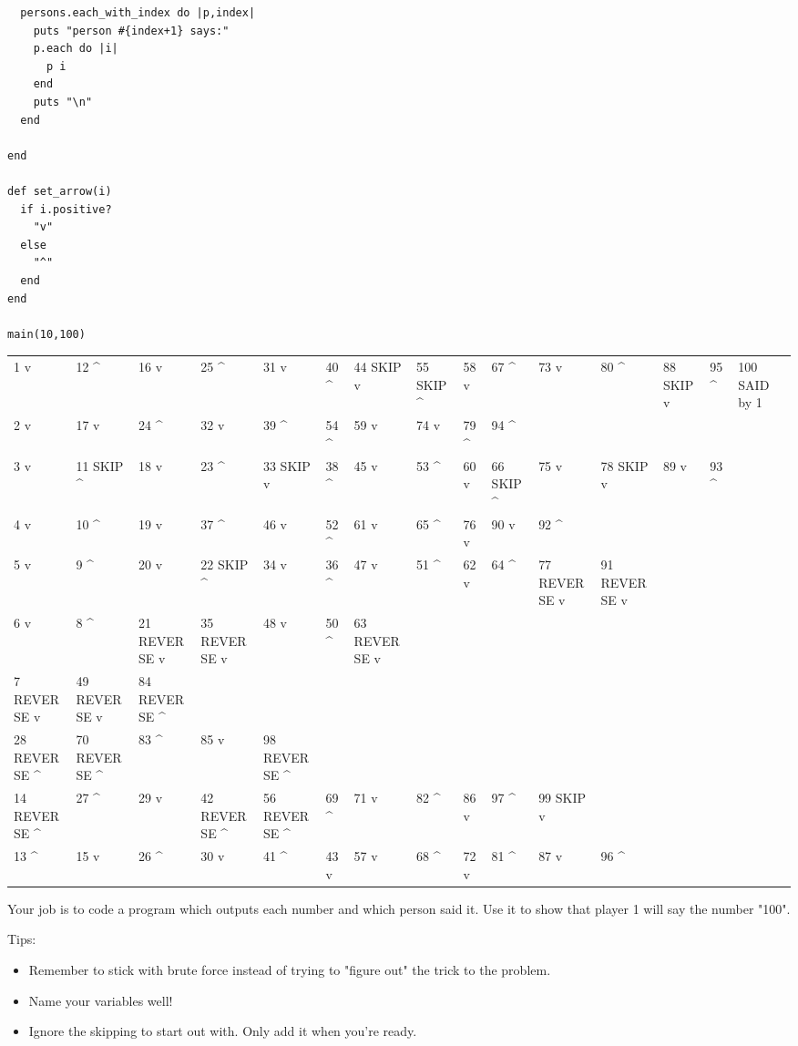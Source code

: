 \documentclass[11pt]{article}
\begin{document}
\begin{itemize}
\begin{verbatim}
  persons.each_with_index do |p,index|
    puts "person #{index+1} says:"
    p.each do |i|
      p i
    end
    puts "\n"
  end

end

def set_arrow(i)
  if i.positive?
    "v"
  else
    "^"
  end
end

main(10,100)
\end{verbatim}

\begin{center}
\begin{tabular}{lllllllllllllll}
1 v & 12 \^{} & 16 v & 25 \^{} & 31 v & 40 \^{} & 44 SKIP v & 55 SKIP \^{} & 58 v & 67 \^{} & 73 v & 80 \^{} & 88 SKIP v & 95 \^{} & 100 SAID by 1\\
2 v & 17 v & 24 \^{} & 32 v & 39 \^{} & 54 \^{} & 59 v & 74 v & 79 \^{} & 94 \^{} &  &  &  &  & \\
3 v & 11 SKIP \^{} & 18 v & 23 \^{} & 33 SKIP v & 38 \^{} & 45 v & 53 \^{} & 60 v & 66 SKIP \^{} & 75 v & 78 SKIP v & 89 v & 93 \^{} & \\
4 v & 10 \^{} & 19 v & 37 \^{} & 46 v & 52 \^{} & 61 v & 65 \^{} & 76 v & 90 v & 92 \^{} &  &  &  & \\
5 v & 9 \^{} & 20 v & 22 SKIP \^{} & 34 v & 36 \^{} & 47 v & 51 \^{} & 62 v & 64 \^{} & 77 REVERSE v & 91 REVERSE v &  &  & \\
6 v & 8 \^{} & 21 REVERSE v & 35 REVERSE v & 48 v & 50 \^{} & 63 REVERSE v &  &  &  &  &  &  &  & \\
7 REVERSE v & 49 REVERSE v & 84 REVERSE \^{} &  &  &  &  &  &  &  &  &  &  &  & \\
28 REVERSE \^{} & 70 REVERSE \^{} & 83 \^{} & 85 v & 98 REVERSE \^{} &  &  &  &  &  &  &  &  &  & \\
14 REVERSE \^{} & 27 \^{} & 29 v & 42 REVERSE \^{} & 56 REVERSE \^{} & 69 \^{} & 71 v & 82 \^{} & 86 v & 97 \^{} & 99 SKIP v &  &  &  & \\
13 \^{} & 15 v & 26 \^{} & 30 v & 41 \^{} & 43 v & 57 v & 68 \^{} & 72 v & 81 \^{} & 87 v & 96 \^{} &  &  & \\
\end{tabular}
\end{center}
\end{itemize}




Your job is to code a program which outputs each number and which person said 
it. Use it to show that  player 1 will say the number "100".

Tips:

\begin{itemize}
\item Remember to stick with brute force instead of trying to "figure out" the 
trick to the problem.
\item Name your variables well!
\item Ignore the skipping to start out with. Only add it when you're ready.
\end{itemize}
\end{document}
